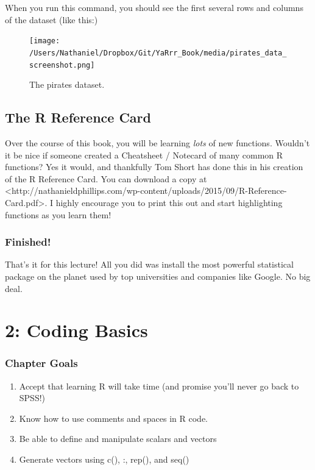 \documentclass{tufte-book}\usepackage[]{graphicx}\usepackage[]{color}
\begin{document}
When you run this command, you should see the first several rows and columns of the dataset (like this:)

\begin{figure}
\texttt{[image: /Users/Nathaniel/Dropbox/Git/YaRrr\_Book/media/pirates\_data\_screenshot.png]}
\caption{The pirates dataset.}
\label{fig:piratesdata}
\end{figure}


\section{The R Reference Card}

Over the course of this book, you will be learning \textit{lots} of new functions. Wouldn't it be nice if someone created a Cheatsheet / Notecard of many common R functions? Yes it would, and thankfully Tom Short has done this in his creation of the R Reference Card. You can download a copy at <http://nathanieldphillips.com/wp-content/uploads/2015/09/R-Reference-Card.pdf>. I highly encourage you to print this out and start highlighting functions as you learn them!


\subsection{Finished!}

That's it for this lecture! All you did was install the most powerful statistical package on the planet used by top universities and companies like Google. No big deal.


\chapter{2: Coding Basics}
\label{ch:2}


\subsection{Chapter Goals}

\begin{enumerate}
  \item Accept that learning R will take time (and promise you'll never go back to SPSS!)
  \item Know how to use comments and spaces in R code.
  \item Be able to define and manipulate scalars and vectors
  \item Generate vectors using c(), :, rep(), and seq()
\end{enumerate}
\end{document}
